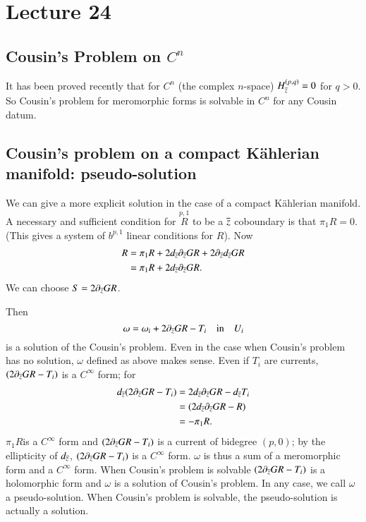 \chapter{Lecture 24}

\section*{Cousin's Problem on $C^{n}$}\pageoriginale

It has been proved recently that for $C^{n}$ (the complex $n$-space)
$H^{(p,q)}_{\overline{z}}=0$ for $q>0$. So Cousin's problem for meromorphic
forms is solvable in $C^{n}$ for any Cousin datum.

\section*{Cousin's problem on a compact K\"ahlerian manifold:
  pseudo-solution}

We can give a more explicit solution in the case of a compact
K\"ahlerian manifold. A necessary and sufficient condition for
$\overset{p,1}{R}$ to be a $\overline{z}$ coboundary is that
$\pi_{1}R=0$. (This gives a system of $b^{p,1}$ linear conditions for
$R$). Now
\begin{align*}
R &=
\pi_{1}R+2d_{\overline{z}}\partial_{\overline{z}}GR+2\partial_{\overline{z}}d_{\overline{z}}GR\\
 &= \pi_{1}R+2d_{\overline{z}} \partial_{\overline{z}}GR.
\end{align*}
We can choose $S=2\partial_{\overline{z}}GR$.

Then 
$$
\omega=\omega_{i}+2\partial_{\overline{z}}GR-T_{i}\quad\text{in}\quad U_{i}
$$
is a solution of the Cousin's problem. Even in the case when Cousin's
problem has no solution, $\omega$ defined as above makes sense. Even
if $T_{i}$ are currents, $(2\partial_{\overline{z}}GR-T_{i})$ is a
$C^{\infty}$ form; for
\begin{align*}
d_{\overline{z}}(2\partial_{\overline{z}}GR-T_{i}) &=
2d_{\overline{z}}\partial_{\overline{z}}GR-d_{\overline{z}}T_{i}\\ 
&= (2d_{\overline{z}}\partial_{\overline{z}}GR-R)\\
 &= -\pi_{1}R. 
\end{align*}
$\pi_{1}R$\pageoriginale is a $C^{\infty}$ form and
$(2\partial_{\overline{z}}GR-T_{i})$ is a current of bidegree $(p,0)$; by
the ellipticity of $d_{\overline{z}}$, $(2\partial_{\overline{z}}GR-T_{i})$ is a
$C^{\infty}$ form. $\omega$ is thus a sum of a meromorphic form and a
$C^{\infty}$ form. When Cousin's problem is solvable
$(2\partial_{\overline{z}}GR-T_{i})$ is a holomorphic form and $\omega$ is a
solution of Cousin's problem. In any case, we call $\omega$ a
pseudo-solution. When Cousin's problem is solvable, the
pseudo-solution is actually a solution.

